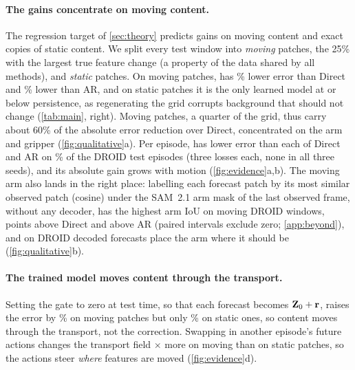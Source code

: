 \paragraph{The gains concentrate on moving content.} The regression target of \cref{sec:theory} predicts gains on moving content
and exact copies of static content.
%
We split every test window into \emph{moving} patches, the 25\% with the largest true feature change (a property of the
data shared by all methods), and \emph{static} patches.
%
On moving patches, \ours{} has \droidMovingVsDirect\% lower error than Direct and \droidMovingVsAR\% lower than AR, and on
static patches it is the only learned model at or below persistence, as regenerating the grid corrupts background that
should not change (\cref{tab:main}, right).
%
Moving patches, a quarter of the grid, thus carry about 60\% of the absolute error reduction over Direct, concentrated
on the arm and gripper (\cref{fig:qualitative}a).
%
Per episode, \ours{} has lower error than each of Direct and AR on \wmWinDirect\% of the \wmEpisodes{} DROID test
episodes (three losses each, none in all three seeds), and its absolute gain grows with motion (\cref{fig:evidence}a,b).
%
The moving arm also lands in the right place: labelling each forecast patch by its most similar observed patch (cosine)
under the SAM~2.1 arm mask of the last observed frame, without any decoder, \ours{} has the highest arm IoU on moving
DROID windows, \segDroidMovGainDi{} points above Direct and \segDroidMovGainAR{} above AR (paired intervals exclude zero;
\cref{app:beyond}), and on DROID decoded forecasts place the arm where it should be (\cref{fig:qualitative}b).

\paragraph{The trained model moves content through the transport.} Setting the gate to zero at test time, so that each forecast becomes
$\mathbf{Z}_0+\mathbf{r}$, raises the error by \koMoving\% on moving patches but only \koStatic\% on static ones, so content moves
through the transport, not the correction.
%
Swapping in another episode's future actions changes the transport field \steerRatio$\times$ more on moving than on
static patches, so the actions steer \emph{where} features are moved (\cref{fig:evidence}d).

